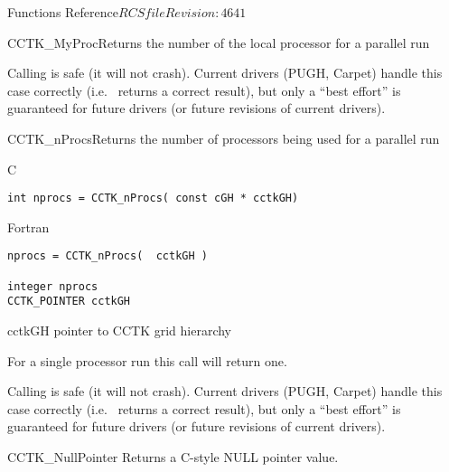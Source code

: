 \begin{cactuspart}{ Functions Reference}{$RCSfile$}{$Revision: 4641 $}
\begin{FunctionDescription}{CCTK\_MyProc}{Returns the number of the local processor for a parallel run}
\begin{Discussion}
Calling  is safe (it will not crash).
Current drivers (PUGH, Carpet) handle this case correctly
(i.e.\  returns a correct result), but only
a ``best effort'' is guaranteed for future drivers (or future revisions
of current drivers).
\end{Discussion}
\end{FunctionDescription}






\begin{FunctionDescription}{CCTK\_nProcs}{Returns the number of processors being used for a parallel run}
\label{CCTK-nProcs}
\begin{SynopsisSection}
\begin{Synopsis}{C}
\begin{verbatim}int nprocs = CCTK_nProcs( const cGH * cctkGH)\end{verbatim}
\end{Synopsis}
\begin{Synopsis}{Fortran}
\begin{verbatim}nprocs = CCTK_nProcs(  cctkGH )

integer nprocs
CCTK_POINTER cctkGH\end{verbatim}
\end{Synopsis}
\end{SynopsisSection}
\begin{ParameterSection}
\begin{Parameter}{cctkGH}
pointer to CCTK grid hierarchy
\end{Parameter}
\end{ParameterSection}
\begin{Discussion}
For a single processor run this call will return one.

Calling  is safe (it will not crash).
Current drivers (PUGH, Carpet) handle this case correctly
(i.e.\  returns a correct result), but only
a ``best effort'' is guaranteed for future drivers (or future revisions
of current drivers).
\end{Discussion}
\end{FunctionDescription}


\begin{FunctionDescription}{CCTK\_NullPointer}%
\label{CCTK-NullPointer}
Returns a C-style NULL pointer value.


\end{FunctionDescription}
\end{cactuspart}
